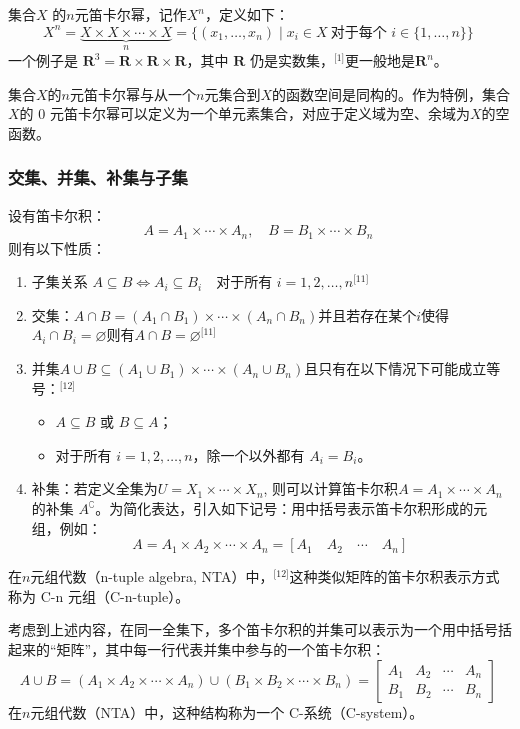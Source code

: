 集合\( X \) 的\(n\)元笛卡尔幂，记作\( X^n \)，定义如下：
\[
X^n = \underbrace{X \times X \times \cdots \times X}_{n} = \{(x_1, \dots, x_n) \mid x_i \in X\ \text{对于每个 } i \in \{1, \dots, n\} \}~
\]
一个例子是 \( \mathbf{R}^3 = \mathbf{R} \times \mathbf{R} \times \mathbf{R} \)，其中 \( \mathbf{R} \) 仍是实数集，\(^\text{[1]}\)更一般地是\( \mathbf{R}^n \)。

集合\( X \)的\(n\)元笛卡尔幂与从一个\(n\)元集合到\( X \)的函数空间是同构的。作为特例，集合\( X \)的 0 元笛卡尔幂可以定义为一个单元素集合，对应于定义域为空、余域为\( X \)的空函数。

\subsubsection{交集、并集、补集与子集}
设有笛卡尔积：
\[
A = A_1 \times \cdots \times A_n,\quad B = B_1 \times \cdots \times B_n~
\]
则有以下性质：

\begin{enumerate}
\item 子集关系 \( A \subseteq B \iff A_i \subseteq B_i \quad \text{对于所有 } i = 1, 2, \ldots, n\)\(^\text{[11]}\)
\item 交集：\(A \cap B = (A_1 \cap B_1) \times \cdots \times (A_n \cap B_n)\)并且若存在某个\( i \)使得\(A_i \cap B_i = \varnothing\)则有\(A \cap B = \varnothing\)\(^\text{[11]}\)
\item 并集\(A \cup B \subseteq (A_1 \cup B_1) \times \cdots \times (A_n \cup B_n)\)且只有在以下情况下可能成立等号：\(^\text{[12]}\) 
\begin{itemize}
\item \( A \subseteq B \) 或 \( B \subseteq A \)；  
\item 对于所有 \( i = 1, 2, \ldots, n \)，除一个以外都有 \( A_i = B_i \)。
\end{itemize}
\item 补集：若定义全集为\(U = X_1 \times \cdots \times X_n\), 则可以计算笛卡尔积\(A = A_1 \times \cdots \times A_n\)的补集 \(A^\complement \)。为简化表达，引入如下记号：用中括号表示笛卡尔积形成的元组，例如：
  \[
  A = A_1 \times A_2 \times \cdots \times A_n = [A_1\quad A_2\quad \cdots\quad A_n]~
  \]
\end{enumerate}
在\(n\)元组代数（n-tuple algebra, NTA）中，\(^\text{[12]}\)这种类似矩阵的笛卡尔积表示方式称为 C-n 元组（C-n-tuple）。

考虑到上述内容，在同一全集下，多个笛卡尔积的并集可以表示为一个用中括号括起来的“矩阵”，其中每一行代表并集中参与的一个笛卡尔积：
\[
A \cup B = (A_1 \times A_2 \times \cdots \times A_n) \cup (B_1 \times B_2 \times \cdots \times B_n) = 
\left[
\begin{array}{cccc}
A_1 & A_2 & \cdots & A_n \\
B_1 & B_2 & \cdots & B_n
\end{array}
\right]~
\]
在\(n\)元组代数（NTA）中，这种结构称为一个 C-系统（C-system）。

